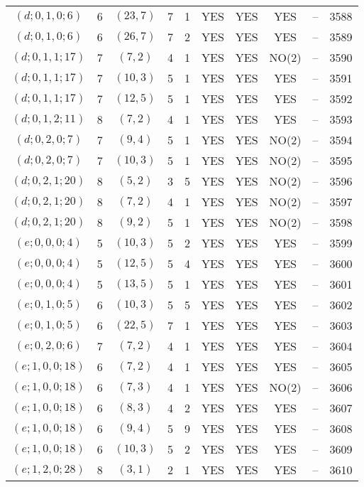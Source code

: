 \begin{longtable}{|c|c|c|c|c|c|c|c|c|c|}
$(d; 0, 1, 0; 6)$ & 6 & $(23, 7)$ & 7 & 1 & YES & YES & YES & -- & 3588\\
$(d; 0, 1, 0; 6)$ & 6 & $(26, 7)$ & 7 & 2 & YES & YES & YES & -- & 3589\\
$(d; 0, 1, 1; 17)$ & 7 & $(7, 2)$ & 4 & 1 & YES & YES & NO(2) & -- & 3590\\
$(d; 0, 1, 1; 17)$ & 7 & $(10, 3)$ & 5 & 1 & YES & YES & YES & -- & 3591\\
$(d; 0, 1, 1; 17)$ & 7 & $(12, 5)$ & 5 & 1 & YES & YES & YES & -- & 3592\\
$(d; 0, 1, 2; 11)$ & 8 & $(7, 2)$ & 4 & 1 & YES & YES & YES & -- & 3593\\
$(d; 0, 2, 0; 7)$ & 7 & $(9, 4)$ & 5 & 1 & YES & YES & NO(2) & -- & 3594\\
$(d; 0, 2, 0; 7)$ & 7 & $(10, 3)$ & 5 & 1 & YES & YES & NO(2) & -- & 3595\\
$(d; 0, 2, 1; 20)$ & 8 & $(5, 2)$ & 3 & 5 & YES & YES & NO(2) & -- & 3596\\
$(d; 0, 2, 1; 20)$ & 8 & $(7, 2)$ & 4 & 1 & YES & YES & NO(2) & -- & 3597\\
$(d; 0, 2, 1; 20)$ & 8 & $(9, 2)$ & 5 & 1 & YES & YES & NO(2) & -- & 3598\\
$(e; 0, 0, 0; 4)$ & 5 & $(10, 3)$ & 5 & 2 & YES & YES & YES & -- & 3599\\
$(e; 0, 0, 0; 4)$ & 5 & $(12, 5)$ & 5 & 4 & YES & YES & YES & -- & 3600\\
$(e; 0, 0, 0; 4)$ & 5 & $(13, 5)$ & 5 & 1 & YES & YES & YES & -- & 3601\\
$(e; 0, 1, 0; 5)$ & 6 & $(10, 3)$ & 5 & 5 & YES & YES & YES & -- & 3602\\
$(e; 0, 1, 0; 5)$ & 6 & $(22, 5)$ & 7 & 1 & YES & YES & YES & -- & 3603\\
$(e; 0, 2, 0; 6)$ & 7 & $(7, 2)$ & 4 & 1 & YES & YES & YES & -- & 3604\\
$(e; 1, 0, 0; 18)$ & 6 & $(7, 2)$ & 4 & 1 & YES & YES & YES & -- & 3605\\
$(e; 1, 0, 0; 18)$ & 6 & $(7, 3)$ & 4 & 1 & YES & YES & NO(2) & -- & 3606\\
$(e; 1, 0, 0; 18)$ & 6 & $(8, 3)$ & 4 & 2 & YES & YES & YES & -- & 3607\\
$(e; 1, 0, 0; 18)$ & 6 & $(9, 4)$ & 5 & 9 & YES & YES & YES & -- & 3608\\
$(e; 1, 0, 0; 18)$ & 6 & $(10, 3)$ & 5 & 2 & YES & YES & YES & -- & 3609\\
$(e; 1, 2, 0; 28)$ & 8 & $(3, 1)$ & 2 & 1 & YES & YES & YES & -- & 3610\\

\end{longtable}
